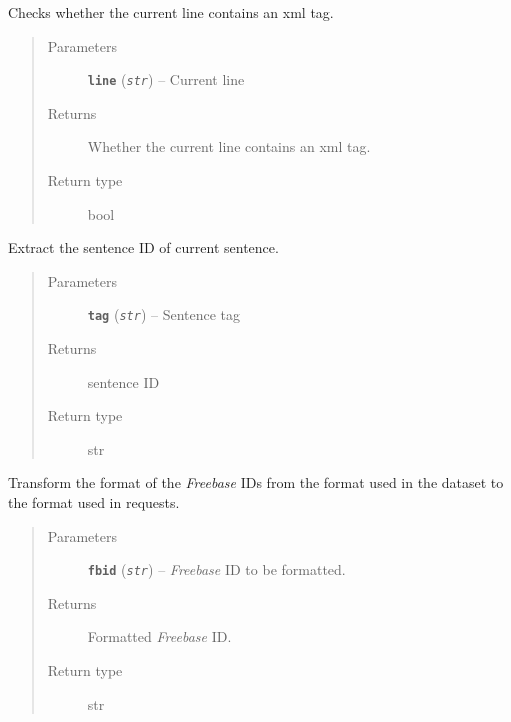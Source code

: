 \documentclass[letterpaper,10pt,english]{sphinxmanual}
\begin{document}
\begin{fulllineitems}
\label{src.misc:src.misc.helpers.contains_tag}
Checks whether the current line contains an xml tag.
\begin{quote}\begin{description}
\item[{Parameters}] \leavevmode
\textbf{\texttt{line}} (\emph{\texttt{str}}) -- Current line

\item[{Returns}] \leavevmode
Whether the current line contains an xml tag.

\item[{Return type}] \leavevmode
bool

\end{description}\end{quote}

\end{fulllineitems}


\begin{fulllineitems}
\label{src.misc:src.misc.helpers.extract_sentence_id}
Extract the sentence ID of current sentence.
\begin{quote}\begin{description}
\item[{Parameters}] \leavevmode
\textbf{\texttt{tag}} (\emph{\texttt{str}}) -- Sentence tag

\item[{Returns}] \leavevmode
sentence ID

\item[{Return type}] \leavevmode
str

\end{description}\end{quote}

\end{fulllineitems}


\begin{fulllineitems}
\label{src.misc:src.misc.helpers.format_fbid}
Transform the format of the \emph{Freebase} IDs from the format used in the dataset to the format used in requests.
\begin{quote}\begin{description}
\item[{Parameters}] \leavevmode
\textbf{\texttt{fbid}} (\emph{\texttt{str}}) -- \emph{Freebase} ID to be formatted.

\item[{Returns}] \leavevmode
Formatted \emph{Freebase} ID.

\item[{Return type}] \leavevmode
str

\end{description}\end{quote}

\end{fulllineitems}
\end{document}
